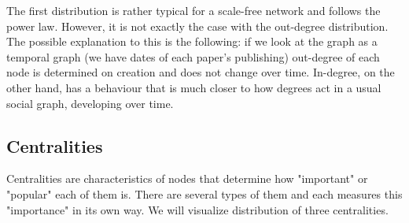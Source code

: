 The first distribution is rather typical for a scale-free network and follows the power law. However, it is not exactly the case with the out-degree distribution. The possible explanation to this is the following: if we look at the graph as a temporal graph (we have dates of each paper's publishing) out-degree of each node is determined on creation and does not change over time. In-degree, on the other hand, has a behaviour that is much closer to how degrees act in a usual social graph, developing over time.

\subsection{Centralities}
\tab Centralities are characteristics of nodes that determine how "important" or "popular" each of them is. There are several types of them and each measures this "importance" in its own way. We will visualize distribution of three centralities.

